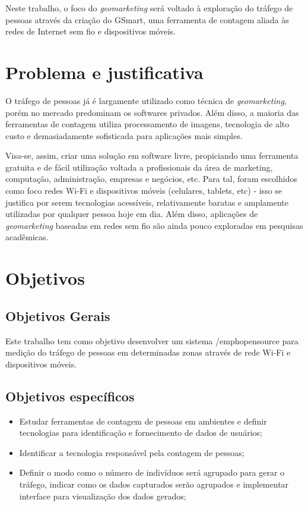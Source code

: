 Neste trabalho, o foco do \emph{geomarketing} será voltado à exploração do tráfego
de pessoas através da criação do GSmart, uma ferramenta de contagem aliada às redes de
Internet sem fio e dispositivos móveis.

\section{Problema e justificativa}
O tráfego de pessoas já é largamente utilizado como técnica de \emph{geomarketing}, porém
no mercado predominam os softwares privados. Além disso, a maioria das ferramentas de contagem utiliza processamento de imagens, tecnologia de alto custo e demasiadamente sofisticada para aplicações mais simples. 

Visa-se, assim, criar uma solução em software livre, propiciando uma ferramenta gratuita e de fácil utilização voltada a profissionais da área de marketing, computação, administração, empresas e negócios, etc. Para tal, foram escolhidos como foco redes Wi-Fi e dispositivos móveis (celulares, tablets, etc) - isso se justifica por serem tecnologias acessíveis, relativamente baratas e amplamente utilizadas por qualquer pessoa hoje em dia. Além disso, aplicações de \emph{geomarketing} baseadas em redes sem fio são ainda pouco exploradas em pesquisas acadêmicas.

\section{Objetivos}
\label{objetivos}

\subsection{Objetivos Gerais}
Este trabalho tem como objetivo desenvolver um sistema /emph{opensource} para medição do tráfego de
pessoas em determinadas zonas através de rede Wi-Fi e dispositivos móveis.

\subsection{Objetivos específicos}
\begin{itemize}
  \item Estudar ferramentas de contagem de pessoas em ambientes e definir tecnologias para identificação e fornecimento de dados de usuários;
  \item Identificar a tecnologia responsável pela contagem de pessoas;
  \item Definir o modo como o número de indivíduos será agrupado para gerar o tráfego, indicar como os dados capturados serão agrupados e implementar interface para visualização dos dados gerados;
\end{itemize}


